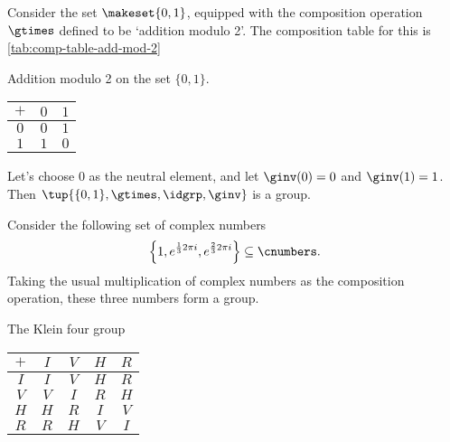 \begin{example}\label{exa:grp-order-two}
    Consider the set $\makeset{ 0, 1 }$, equipped with the composition operation $\gtimes$ defined to be `addition modulo 2'. The composition table for this is \cref{tab:comp-table-add-mod-2}
    \begin{margintable}
    \caption{Addition modulo 2 on the set $\{ 0, 1 \}$.}
    \label{tab:comp-table-add-mod-2}
    \centering
    \begin{tabular}{c|cc}
        $+$ & $0$ & $1$ \\
        \hline
        $0$   & $0$ & $1$ \\
        $1$    & $1$ & $0$
    \end{tabular}
\end{margintable}

Let's choose $0$ as the neutral element, and let $\ginv(0) = 0$ and $\ginv(1) = 1$. Then $\tup{\{ 0, 1 \}, \gtimes, \idgrp, \ginv}$ is a group.
\end{example}


\begin{example}
    \label{grp-order-three}
    Consider the following set of complex numbers
    \begin{equation*}
        \Big\{ 1, e^{\frac{1}{3}2\pi i}, e^{\frac{2 }{3}2\pi i}  \Big\} \subseteq \cnumbers.
    \end{equation*}
    Taking the usual multiplication of complex numbers as the composition operation, these three numbers form a group.
\end{example}

\begin{margintable}
    \caption{The Klein four group}
    \label{tab:comp-table-Klein4}
    \centering
    \begin{tabular}{c|cccc}
        $+$ & $I$ & $V$ & $H$ & $R$ \\
        \hline
        $I$ & $I$ & $V$ & $H$ & $R$ \\
        $V$ & $V$ & $I$ & $R$ & $H$ \\
        $H$ & $H$ & $R$ & $I$ & $V$ \\
        $R$ & $R$ & $H$ & $V$ & $I$
    \end{tabular}
\end{margintable}

